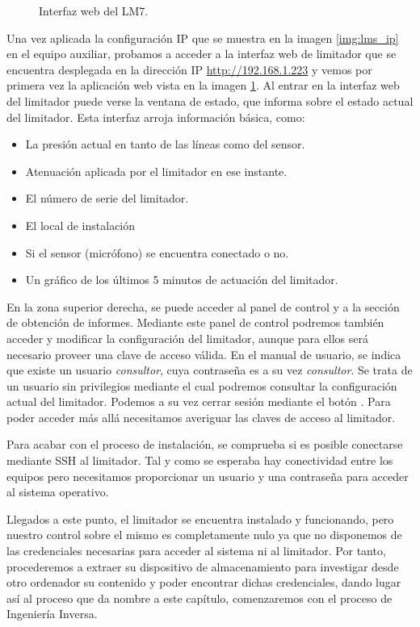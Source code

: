 \begin{figure}[ht]
\begin{minipage}[t]{.45\textwidth}
        \caption{Interfaz web del \acrshort{LM7}.}
        \label{img:lms_ui}
    \end{minipage}
\end{figure}

Una vez aplicada la configuración \acrshort{IP} que se muestra en la imagen \ref{img:lms_ip} en el equipo auxiliar, probamos a acceder a la interfaz web de limitador que se encuentra desplegada en la dirección \acrshort{IP} \url{http://192.168.1.223} y vemos por primera vez la aplicación web vista en la imagen \ref{img:lms_ui}. Al entrar en la interfaz web del limitador puede verse la ventana de estado, que informa sobre el estado actual del limitador. Esta interfaz arroja información básica, como:

\begin{itemize}
    \item La presión actual en  tanto de las líneas como del sensor.
    \item Atenuación aplicada por el limitador en ese instante.
    \item El número de serie del limitador.
    \item El local de instalación
    \item Si el sensor (micrófono) se encuentra conectado o no.
    \item Un gráfico de los últimos 5 minutos de actuación del limitador.
\end{itemize}

En la zona superior derecha, se puede acceder al panel de control y a la sección de obtención de informes. Mediante este panel de control podremos también acceder y modificar la configuración del limitador, aunque para ellos será necesario proveer una clave de acceso válida. En el manual de usuario, se indica que existe un usuario \textit{consultor}, cuya contraseña es a su vez \textit{consultor}. Se trata de un usuario sin privilegios mediante el cual podremos consultar la configuración actual del limitador. Podemos a su vez cerrar sesión mediante el botón . Para poder acceder más allá necesitamos averiguar las claves de acceso al limitador.

Para acabar con el proceso de instalación, se comprueba si es posible conectarse mediante \acrshort{SSH} al limitador. Tal y como se esperaba hay conectividad entre los equipos pero necesitamos proporcionar un usuario y una contraseña para acceder al sistema operativo.

Llegados a este punto, el limitador se encuentra instalado y funcionando, pero nuestro control sobre el mismo es completamente nulo ya que no disponemos de las credenciales necesarias para acceder al sistema ni al limitador. Por tanto, procederemos a extraer su dispositivo de almacenamiento para investigar desde otro ordenador su contenido y poder encontrar dichas credenciales, dando lugar así al proceso que da nombre a este capítulo, comenzaremos con el proceso de Ingeniería Inversa.

